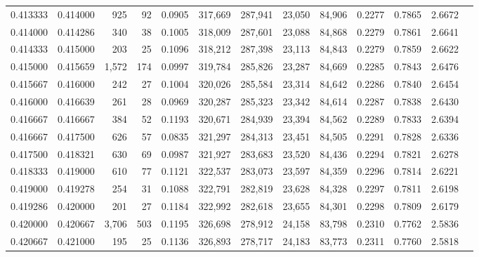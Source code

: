 \begin{tabular}{rrrrrrrrrrrrr}
0.413333 & 0.414000 &   925 &  92 &                                     0.0905 & 317,669 & 287,941 &  23,050 &  84,906 & 0.2277 & 0.7865 & 2.6672 \\
0.414000 & 0.414286 &   340 &  38 &                                     0.1005 & 318,009 & 287,601 &  23,088 &  84,868 & 0.2279 & 0.7861 & 2.6641 \\
0.414333 & 0.415000 &   203 &  25 &                                     0.1096 & 318,212 & 287,398 &  23,113 &  84,843 & 0.2279 & 0.7859 & 2.6622 \\
0.415000 & 0.415659 & 1,572 & 174 &                                     0.0997 & 319,784 & 285,826 &  23,287 &  84,669 & 0.2285 & 0.7843 & 2.6476 \\
0.415667 & 0.416000 &   242 &  27 &                                     0.1004 & 320,026 & 285,584 &  23,314 &  84,642 & 0.2286 & 0.7840 & 2.6454 \\
0.416000 & 0.416639 &   261 &  28 &                                     0.0969 & 320,287 & 285,323 &  23,342 &  84,614 & 0.2287 & 0.7838 & 2.6430 \\
0.416667 & 0.416667 &   384 &  52 &                                     0.1193 & 320,671 & 284,939 &  23,394 &  84,562 & 0.2289 & 0.7833 & 2.6394 \\
0.416667 & 0.417500 &   626 &  57 &                                     0.0835 & 321,297 & 284,313 &  23,451 &  84,505 & 0.2291 & 0.7828 & 2.6336 \\
0.417500 & 0.418321 &   630 &  69 &                                     0.0987 & 321,927 & 283,683 &  23,520 &  84,436 & 0.2294 & 0.7821 & 2.6278 \\
0.418333 & 0.419000 &   610 &  77 &                                     0.1121 & 322,537 & 283,073 &  23,597 &  84,359 & 0.2296 & 0.7814 & 2.6221 \\
0.419000 & 0.419278 &   254 &  31 &                                     0.1088 & 322,791 & 282,819 &  23,628 &  84,328 & 0.2297 & 0.7811 & 2.6198 \\
0.419286 & 0.420000 &   201 &  27 &                                     0.1184 & 322,992 & 282,618 &  23,655 &  84,301 & 0.2298 & 0.7809 & 2.6179 \\
0.420000 & 0.420667 & 3,706 & 503 &                                     0.1195 & 326,698 & 278,912 &  24,158 &  83,798 & 0.2310 & 0.7762 & 2.5836 \\
0.420667 & 0.421000 &   195 &  25 &                                     0.1136 & 326,893 & 278,717 &  24,183 &  83,773 & 0.2311 & 0.7760 & 2.5818 \\

\end{tabular}
